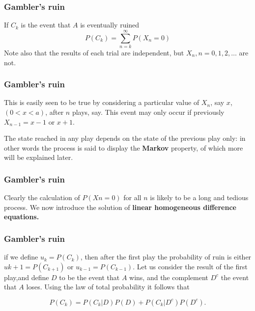\documentclass[spanish]{beamer}
\begin{document}
\begin{frame}
\frametitle{Gambler’s ruin}
If $C_{k}$ is the event that $A$ is eventually ruined
\begin{equation*}
P(C_{k})= \displaystyle \sum_{n=k}^{\infty}P(X_{n}=0)
\end{equation*}
Note also that the results of each trial are independent, but $X_{n} , n = 0, 1, 2,\ldots$  are not.

\end{frame}
\begin{frame}
\frametitle{Gambler’s ruin}
This is easily seen to be true by considering a particular value of $X _{n}$, say $x$, $(0 < x < a)$, after $n$ plays, say. This event may only occur if previously $X_{n-1} = x - 1$  or $x + 1$.

The state reached in any play depends on the state of the previous play only: in other words the process is said to display the \textbf{Markov} property, of which more will be explained later.
\end{frame}
\begin{frame}
\frametitle{Gambler’s ruin}
Clearly the calculation of $P(X n = 0)$ for all $n$ is likely to be a long and tedious
process. We now introduce the solution of \textbf{linear homogeneous difference equations.}
\end{frame}
\begin{frame}
\frametitle{Gambler’s ruin}
if we define $u_k = P(C_k)$, then after the first play the probability of ruin is either $u{k+1} = P(C_{k+1} )$ or $u_{k-1} = P(C_{k-1})$. Let us consider the result of the first play,and define $D$ to be the event that $A$ wins, and the complement $D^{c}$ the event that $A$ loses. Using the law of total probability it follows that

\begin{equation*}
P(C_{k}) = P(C_{k}|D)P(D) + P(C_k \vert D^{c} )P(D^{c}).
\end{equation*}
\end{frame}
\end{document}
